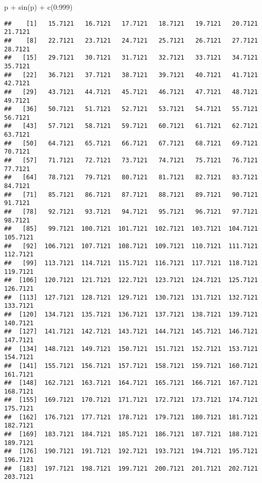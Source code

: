 \documentclass[
]{article}
\newenvironment{Shaded}{\begin{snugshade}}{\end{snugshade}}
\newcommand{\DecValTok}[1]{\textcolor[rgb]{0.00,0.00,0.81}{#1}}
\newcommand{\FunctionTok}[1]{\textcolor[rgb]{0.00,0.00,0.00}{#1}}
\newcommand{\NormalTok}[1]{#1}
\newcommand{\SpecialCharTok}[1]{\textcolor[rgb]{0.00,0.00,0.00}{#1}}
\begin{document}
\begin{Shaded}
\begin{Highlighting}[]
\NormalTok{p }\SpecialCharTok{+} \FunctionTok{sin}\NormalTok{(p) }\SpecialCharTok{+} \FunctionTok{c}\NormalTok{(}\DecValTok{0}\SpecialCharTok{:}\DecValTok{999}\NormalTok{)}
\end{Highlighting}
\end{Shaded}

\begin{verbatim}
##    [1]   15.7121   16.7121   17.7121   18.7121   19.7121   20.7121   21.7121
##    [8]   22.7121   23.7121   24.7121   25.7121   26.7121   27.7121   28.7121
##   [15]   29.7121   30.7121   31.7121   32.7121   33.7121   34.7121   35.7121
##   [22]   36.7121   37.7121   38.7121   39.7121   40.7121   41.7121   42.7121
##   [29]   43.7121   44.7121   45.7121   46.7121   47.7121   48.7121   49.7121
##   [36]   50.7121   51.7121   52.7121   53.7121   54.7121   55.7121   56.7121
##   [43]   57.7121   58.7121   59.7121   60.7121   61.7121   62.7121   63.7121
##   [50]   64.7121   65.7121   66.7121   67.7121   68.7121   69.7121   70.7121
##   [57]   71.7121   72.7121   73.7121   74.7121   75.7121   76.7121   77.7121
##   [64]   78.7121   79.7121   80.7121   81.7121   82.7121   83.7121   84.7121
##   [71]   85.7121   86.7121   87.7121   88.7121   89.7121   90.7121   91.7121
##   [78]   92.7121   93.7121   94.7121   95.7121   96.7121   97.7121   98.7121
##   [85]   99.7121  100.7121  101.7121  102.7121  103.7121  104.7121  105.7121
##   [92]  106.7121  107.7121  108.7121  109.7121  110.7121  111.7121  112.7121
##   [99]  113.7121  114.7121  115.7121  116.7121  117.7121  118.7121  119.7121
##  [106]  120.7121  121.7121  122.7121  123.7121  124.7121  125.7121  126.7121
##  [113]  127.7121  128.7121  129.7121  130.7121  131.7121  132.7121  133.7121
##  [120]  134.7121  135.7121  136.7121  137.7121  138.7121  139.7121  140.7121
##  [127]  141.7121  142.7121  143.7121  144.7121  145.7121  146.7121  147.7121
##  [134]  148.7121  149.7121  150.7121  151.7121  152.7121  153.7121  154.7121
##  [141]  155.7121  156.7121  157.7121  158.7121  159.7121  160.7121  161.7121
##  [148]  162.7121  163.7121  164.7121  165.7121  166.7121  167.7121  168.7121
##  [155]  169.7121  170.7121  171.7121  172.7121  173.7121  174.7121  175.7121
##  [162]  176.7121  177.7121  178.7121  179.7121  180.7121  181.7121  182.7121
##  [169]  183.7121  184.7121  185.7121  186.7121  187.7121  188.7121  189.7121
##  [176]  190.7121  191.7121  192.7121  193.7121  194.7121  195.7121  196.7121
##  [183]  197.7121  198.7121  199.7121  200.7121  201.7121  202.7121  203.7121

\end{verbatim}
\end{document}
